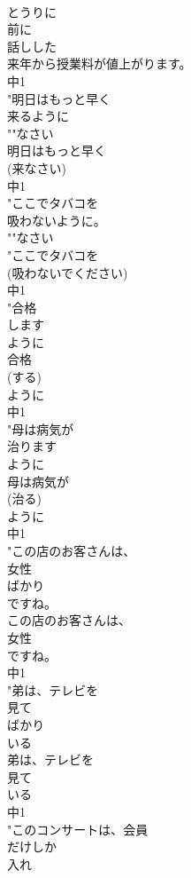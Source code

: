 \documentclass[8pt]{extreport}
\begin{document}
\begin{CJK}{UTF8}{min}
\\	とうりに 
\\	前に
\\	話しした
\\	来年から授業料が値上がります。
\\	中1
\\	"明日はもっと早く
\\	来るように
\\	""なさい
\\	明日はもっと早く
\\	(来なさい)
\\	中1
\\	"ここでタバコを
\\	吸わないように。
\\	""なさい
\\	"ここでタバコを
\\	(吸わないでください)
\\	中1
\\	"合格
\\	します
\\	ように
\\	合格
\\	(する)
\\	ように
\\	中1
\\	"母は病気が
\\	治ります
\\	ように
\\	母は病気が
\\	(治る)
\\	ように
\\	中1
\\	"この店のお客さんは、
\\	女性
\\	ばかり
\\	ですね。
\\	この店のお客さんは、
\\	女性
\\	ですね。
\\	中1
\\	"弟は、テレビを
\\	見て
\\	ばかり
\\	いる
\\	弟は、テレビを
\\	見て
\\	いる
\\	中1
\\	"このコンサートは、会員
\\	だけしか
\\	入れ

\end{CJK}
\end{document}
